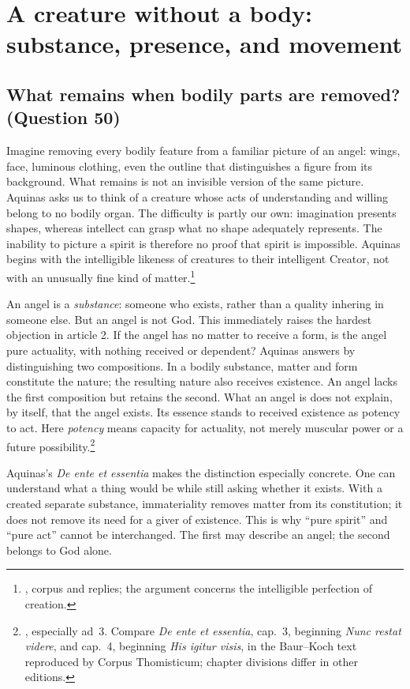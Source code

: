 \section{A creature without a body: substance, presence, and movement}
\label{sec:angel-nature}

\subsection{What remains when bodily parts are removed? (Question 50)}

Imagine removing every bodily feature from a familiar picture of an angel: wings, face, luminous clothing, even the outline that distinguishes a figure from its background. What remains is not an invisible version of the same picture. Aquinas asks us to think of a creature whose acts of understanding and willing belong to no bodily organ. The difficulty is partly our own: imagination presents shapes, whereas intellect can grasp what no shape adequately represents. The inability to picture a spirit is therefore no proof that spirit is impossible. Aquinas begins with the intelligible likeness of creatures to their intelligent Creator, not with an unusually fine kind of matter.\footnote{, corpus and replies; the argument concerns the intelligible perfection of creation.}

An angel is a \emph{substance}: someone who exists, rather than a quality inhering in someone else. But an angel is not God. This immediately raises the hardest objection in article 2. If the angel has no matter to receive a form, is the angel pure actuality, with nothing received or dependent? Aquinas answers by distinguishing two compositions. In a bodily substance, matter and form constitute the nature; the resulting nature also receives existence. An angel lacks the first composition but retains the second. What an angel is does not explain, by itself, that the angel exists. Its essence stands to received existence as potency to act. Here \emph{potency} means capacity for actuality, not merely muscular power or a future possibility.\footnote{, especially ad~3. Compare \emph{De ente et essentia}, cap.~3, beginning \emph{Nunc restat videre}, and cap.~4, beginning \emph{His igitur visis}, in the Baur--Koch text reproduced by Corpus Thomisticum; chapter divisions differ in other editions.}

Aquinas's \emph{De ente et essentia} makes the distinction especially concrete. One can understand what a thing would be while still asking whether it exists. With a created separate substance, immateriality removes matter from its constitution; it does not remove its need for a giver of existence. This is why ``pure spirit'' and ``pure act'' cannot be interchanged. The first may describe an angel; the second belongs to God alone.

